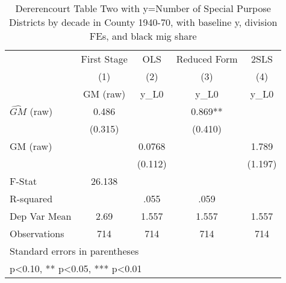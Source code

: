 \begin{table}[htbp]\centering
\def\sym#1{\ifmmode^{#1}\else\(^{#1}\)\fi}
\caption{Dererencourt Table Two with y=Number of Special Purpose Districts by decade in County 1940-70, with baseline y, division FEs, and black mig share}
\begin{tabular}{l*{4}{c}}
\toprule
                    & First Stage   &         OLS   &Reduced Form   &        2SLS   \\
                    &\multicolumn{1}{c}{(1)}&\multicolumn{1}{c}{(2)}&\multicolumn{1}{c}{(3)}&\multicolumn{1}{c}{(4)}\\
                    &\multicolumn{1}{c}{GM  (raw)}&\multicolumn{1}{c}{y\_L0}&\multicolumn{1}{c}{y\_L0}&\multicolumn{1}{c}{y\_L0}\\
\midrule
$\hat{GM}$ (raw)    &       0.486   &               &       0.869** &               \\
                    &     (0.315)   &               &     (0.410)   &               \\
\addlinespace
GM  (raw)           &               &      0.0768   &               &       1.789   \\
                    &               &     (0.112)   &               &     (1.197)   \\
\midrule
F-Stat              &      26.138   &               &               &               \\
R-squared           &               &        .055   &        .059   &               \\
Dep Var Mean        &        2.69   &       1.557   &       1.557   &       1.557   \\
Observations        &         714   &         714   &         714   &         714   \\
\bottomrule
\multicolumn{5}{l}{\footnotesize Standard errors in parentheses}\\
\multicolumn{5}{l}{\footnotesize * p<0.10, ** p<0.05, *** p<0.01}\\
\end{tabular}
\end{table}

